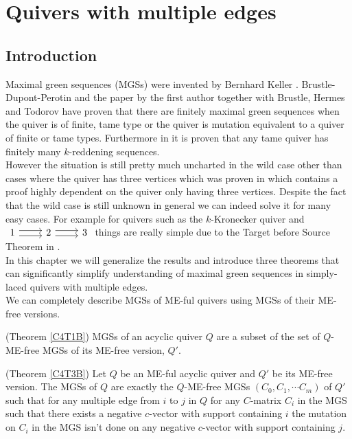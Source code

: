 \chapter{Quivers with multiple edges}\label{C4}
\section{Introduction}
\indent Maximal green sequences (MGSs) were invented by Bernhard Keller \cite{Kel11}. Brustle-Dupont-Perotin \cite{BDP13} and the paper by the first author together with Brustle, Hermes and Todorov \cite{BHIT15} have proven that there are finitely maximal green sequences when the quiver is of finite, tame type or the quiver is mutation equivalent to a quiver of finite or tame types. Furthermore in \cite{BHIT15} it is proven that any tame quiver has finitely many $k$-reddening sequences.\\
\indent However the situation is still pretty much uncharted in the wild case other than cases where the quiver has three vertices which was proven in  \cite{BDP13} which contains a proof highly dependent on the quiver only having three vertices. Despite the fact that the wild case is still unknown in general we can indeed solve it for many easy cases. For example for quivers such as the $k$-Kronecker quiver and $\begin{tikzcd}1\arrow[r, shift right=0.6ex]\arrow[r, shift left=0.6ex] & 2\arrow[r, shift right=0.6ex]\arrow[r, shift left=0.6ex] & 3\end{tikzcd}$ things are really simple due to the Target before Source Theorem in \cite{BHIT15}.\\
\indent In this chapter we will generalize the results and introduce three theorems that can significantly simplify understanding of maximal green sequences in simply-laced quivers with multiple edges.\\
\indent We can completely describe MGSs of ME-ful quivers using MGSs of their ME-free versions.\\
\begin{theorem}
(Theorem \ref{C4T1B}) MGSs of an acyclic quiver $Q$ are a subset of the set of $Q$-ME-free MGSs of its ME-free version, $Q'$.\label{C4T1}
\end{theorem}
\begin{theorem}
(Theorem \ref{C4T3B}) Let $Q$ be an ME-ful acyclic quiver and $Q'$ be its ME-free version. The MGSs of $Q$ are exactly the $Q$-ME-free MGSs $(C_0,C_1,\cdots C_m)$ of $Q'$ such that for any multiple edge from $i$ to $j$ in $Q$ for any $C$-matrix $C_i$ in the MGS such that there exists a negative $c$-vector with support containing $i$ the mutation on $C_i$ in the MGS isn't done on any negative $c$-vector with support containing $j$.\label{C4T3}
\end{theorem}
